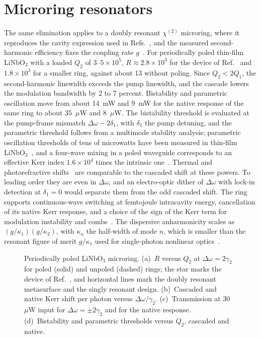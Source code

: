 \documentclass[aps,prapplied,onecolumn,superscriptaddress,longbibliography,nofootinbib]{revtex4-2}
\newcommand{\chitwo}{\chi^{(2)}}
\newcommand{\Dom}{\Delta\omega}
\newcommand{\figbox}[1]{%
  \fbox{\parbox[c][#1][c]{0.92\linewidth}{\centering\small figure in preparation}}}
\begin{document}
\section{Microring resonators}\label{sec:ring}

The same elimination applies to a doubly resonant $\chitwo$ microring,
where it reproduces the cavity expression used in
Refs.~\cite{cui2022,cui2025}, and the measured second-harmonic efficiency
fixes the coupling rate $g$~\cite{lu2019,lu2020,zhao2022}.  For
periodically poled thin-film LiNbO$_3$ with a loaded $Q_2$ of
$3$--$5\times10^5$, $R\approx2.8\times10^3$ for the device of
Ref.~\cite{lu2020} and $1.8\times10^3$ for a smaller ring, against about
13 without poling.  Since $Q_2<2Q_1$, the second-harmonic linewidth
exceeds the pump linewidth, and the cascade lowers the modulation
bandwidth by 2 to 7 percent.  Bistability and parametric oscillation move
from about 14~mW and 9~mW for the native response of the same ring to
about 35~$\mu$W and 8~$\mu$W.  The bistability threshold is evaluated at
the pump-frame mismatch $\Dom-2\delta_1$, with $\delta_1$ the pump
detuning, and the parametric threshold follows from a multimode stability
analysis; parametric oscillation thresholds of tens of microwatts have
been measured in thin-film LiNbO$_3$~\cite{lu2021,mckenna2022}, and a
four-wave mixing in a poled waveguide corresponds to an effective Kerr
index $1.6\times10^4$ times the intrinsic one~\cite{li2026}.  Thermal and
photorefractive shifts~\cite{xu2021} are comparable
to the cascaded shift at these powers.  To leading order they are even in
$\Dom$, and an electro-optic dither of $\Dom$ with lock-in detection at
$\delta_1=0$ would separate them from the odd cascaded shift.  The ring
supports continuous-wave switching at femtojoule intracavity energy,
cancellation of its native Kerr response, and a choice of the sign of
the Kerr term for modulation instability and
combs~\cite{tang2024,bruch2021}.  The dispersive anharmonicity scales as
$(g/\kappa_1)(g/\kappa_2)$, with $\kappa_n$ the half-width of mode $n$,
which is smaller than the resonant figure of merit $g/\kappa_1$ used for
single-photon nonlinear optics~\cite{lu2020}.

\begin{figure}[t]
  \centering
  \figbox{4cm}
  \caption{Periodically poled LiNbO$_3$ microring.
    (a)~$R$ versus $Q_2$ at $\Dom=2\gamma_2$ for poled (solid) and
    unpoled (dashed) rings; the star marks the device of
    Ref.~\cite{lu2020}, and horizontal lines mark the doubly resonant
    metasurface and the singly resonant design.
    (b)~Cascaded and native Kerr shift per photon versus $\Dom/\gamma_2$.
    (c)~Transmission at 30~$\mu$W input for $\Dom=\pm2\gamma_2$ and for the
    native response.
    (d)~Bistability and parametric thresholds versus $Q_2$, cascaded and
    native.}
  \label{fig:ring}
\end{figure}
\end{document}
